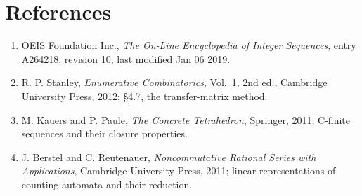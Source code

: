 \documentclass[11pt]{article}
\theoremstyle{definition}
\begin{document}
\section{References}

\begin{enumerate}

\item OEIS Foundation Inc., \emph{The On-Line Encyclopedia of Integer Sequences}, entry \href{https://oeis.org/A264218}{A264218}, revision 10, last modified Jan 06 2019.

\item R. P. Stanley, \emph{Enumerative Combinatorics}, Vol.~1, 2nd ed., Cambridge University Press, 2012; \S4.7, the transfer-matrix method.

\item M. Kauers and P. Paule, \emph{The Concrete Tetrahedron}, Springer, 2011; C-finite sequences and their closure properties.

\item J. Berstel and C. Reutenauer, \emph{Noncommutative Rational Series with Applications}, Cambridge University Press, 2011; linear representations of counting automata and their reduction.

\end{enumerate}
\end{document}
